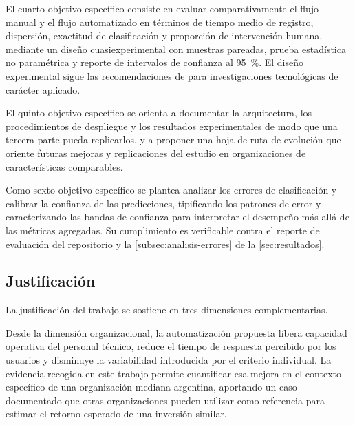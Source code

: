 El cuarto objetivo específico consiste en evaluar comparativamente el flujo manual y el flujo automatizado en términos de tiempo medio de registro, dispersión, exactitud de clasificación y proporción de intervención humana, mediante un diseño cuasiexperimental con muestras pareadas, prueba estadística no paramétrica y reporte de intervalos de confianza al 95~\%. El diseño experimental sigue las recomendaciones de \textcite{HernandezSampieri2018_metodologia} para investigaciones tecnológicas de carácter aplicado.

El quinto objetivo específico se orienta a documentar la arquitectura, los procedimientos de despliegue y los resultados experimentales de modo que una tercera parte pueda replicarlos, y a proponer una hoja de ruta de evolución que oriente futuras mejoras y replicaciones del estudio en organizaciones de características comparables.

Como sexto objetivo específico se plantea analizar los errores de clasificación y calibrar la confianza de las predicciones, tipificando los patrones de error y caracterizando las bandas de confianza para interpretar el desempeño más allá de las métricas agregadas. Su cumplimiento es verificable contra el reporte de evaluación del repositorio y la \autoref{subsec:analisis-errores} de la \autoref{sec:resultados}.

\subsection{Justificación}\label{subsec:justificacion}

La justificación del trabajo se sostiene en tres dimensiones complementarias.

Desde la dimensión organizacional, la automatización propuesta libera capacidad operativa del personal técnico, reduce el tiempo de respuesta percibido por los usuarios y disminuye la variabilidad introducida por el criterio individual. La evidencia recogida en este trabajo permite cuantificar esa mejora en el contexto específico de una organización mediana argentina, aportando un caso documentado que otras organizaciones pueden utilizar como referencia para estimar el retorno esperado de una inversión similar.

